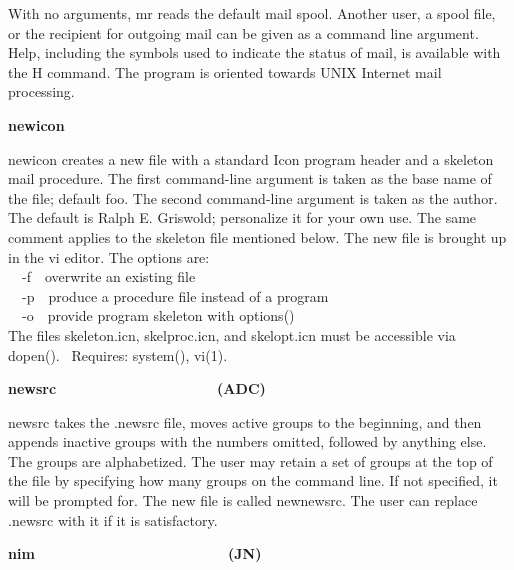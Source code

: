 {With no arguments, \textsf{mr} reads the default mail
spool. Another user, a spool file, or the recipient for outgoing mail
can be given as a command line argument. Help, including the symbols
used to indicate the status of mail, is available with the H command.
The program is oriented towards UNIX Internet mail processing.

{\sffamily\bfseries
newicon\ \ \ \ \ \ \ \ \ \ \ \ \ \ \ \ \ \ \ \ }

\textsf{newicon} creates a new file with a standard Icon program header
and a skeleton mail procedure. The first command-line argument is taken
as the base name of the file; default
{\textquotedbl}foo{\textquotedbl}. The second command-line argument is
taken as the author. The default is {\textquotedbl}Ralph E.
Griswold{\textquotedbl}; personalize it for your own use. The same
comment applies to the skeleton file mentioned below.
The new file is brought up in the vi editor. The options
are:\\
\ \ \textsf{{}-f}\ \ overwrite an existing file\\
\ \ \textsf{{}-p}\ \ produce a procedure file instead of a
program\\
\ \ \textsf{{}-o}\ \ provide program skeleton with
\textsf{options()}\\
The files \textsf{skeleton.icn}, \textsf{skelproc.icn}, and
\textsf{skelopt.icn} must be accessible via \textsf{dopen()}.
\ Requires: system(), vi(1).

{\sffamily\bfseries
newsrc\ \ \ \ \ \ \ \ \ \ \ \ \ \ \ \ \ \ \ \ (ADC)}

\textsf{news}\textsf{rc} takes the \textsf{.newsrc} file,
moves active groups to the beginning, and then appends inactive groups
with the numbers omitted, followed by anything else. The groups are
alphabetized. The user may retain a set of groups at the top of the
file by specifying how many groups on the command line. If not
specified, it will be prompted for. The new file is called newnewsrc.
The user can replace .newsrc with it if it is satisfactory. 

{\sffamily\bfseries
nim\ \ \ \ \ \ \ \ \ \ \ \ \ \ \ \ \ \ \ \ \ \  \ \ (JN)}

}
